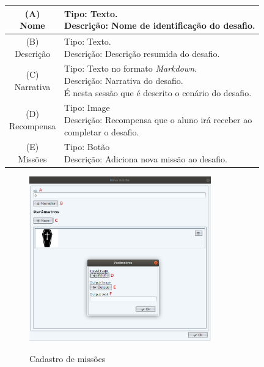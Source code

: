 \documentclass[
	12pt,				%
	oneside,			%
	a4paper,			%
	english,			%
	french,				%
	spanish,			%
	brazil,				%
	]{abntex2}
\begin{document}
\begin{table}[H]
\centering
{} \label{tab:manutencaoDesafios}
\renewcommand{\arraystretch}{1.8}
\setlength{\tabcolsep}{10pt}
\begin{tabular}{|c|l|}
  \hline
  \makecell{(A) \\ Nome} 
  &
  \makecell[l]{Tipo: Texto. \\  Descrição: Nome de identificação do desafio.} \\
  \hline
  \makecell{(B) \\ Descrição} 
  &
  \makecell[l]{Tipo: Texto.\\ Descrição: Descrição resumida do desafio.} \\
  \hline
  \makecell{(C) \\ Narrativa} 
  &
  \makecell[l]{Tipo: Texto no formato \textit{Markdown}.\\ Descrição: Narrativa do desafio. 
  \\ É nesta sessão que é descrito o cenário do desafio.} \\
  \hline
  \makecell{(D) \\ Recompensa} 
  &
  \makecell[l]{Tipo: Image \\ Descrição: Recompensa que o aluno irá receber ao \\ completar o desafio.} \\
  \hline
  \makecell{(E) \\ Missões} 
  &
  \makecell[l]{Tipo: Botão \\ Descrição: Adiciona nova missão ao desafio.} \\
  \hline  
\end{tabular}
\centering
\sourceAuthor
\end{table}

\begin{figure}[H]
\centering
\caption{Cadastro de missões}
\includegraphics[width=0.7\textwidth]{imagens/visnode_cadastro_missao.png}
\sourceAuthor
\label{fig:visnodeCadastroMissoes}
\end{figure}
\end{document}
